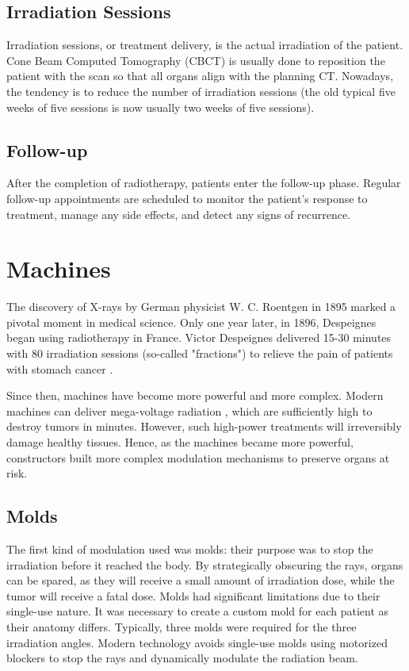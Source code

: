 \subsection{Irradiation Sessions}
Irradiation sessions, or treatment delivery, is the actual irradiation of the patient.
Cone Beam Computed Tomography (CBCT) is usually done to reposition the patient with the scan so that all organs align with the planning CT.
Nowadays, the tendency is to reduce the number of irradiation sessions (the old typical five weeks of five sessions is now usually two weeks of five sessions).

\subsection{Follow-up}
After the completion of radiotherapy, patients enter the follow-up phase.
Regular follow-up appointments are scheduled to monitor the patient's response to treatment, manage any side effects, and detect any signs of recurrence.

\section{Machines}
The discovery of X-rays by German physicist W. C. Roentgen in 1895 marked a pivotal moment in medical science.
Only one year later, in 1896, Despeignes began using radiotherapy in France.
Victor Despeignes delivered 15-30 minutes with 80 irradiation sessions (so-called "fractions") to relieve the pain of patients with stomach cancer \cite{Holsti1995}.

Since then, machines have become more powerful and more complex.
Modern machines can deliver mega-voltage radiation \cite{Huh2020}, which are sufficiently high to destroy tumors in minutes.
However, such high-power treatments will irreversibly damage healthy tissues.
Hence, as the machines became more powerful, constructors built more complex modulation mechanisms to preserve organs at risk.

\subsection{Molds}
The first kind of modulation used was molds: their purpose was to stop the irradiation before it reached the body.
By strategically obscuring the rays, organs can be spared, as they will receive a small amount of irradiation dose, while the tumor will receive a fatal dose.
Molds had significant limitations due to their single-use nature.
It was necessary to create a custom mold for each patient as their anatomy differs.
Typically, three molds were required for the three irradiation angles.
Modern technology avoids single-use molds using motorized blockers to stop the rays and dynamically modulate the radiation beam.

